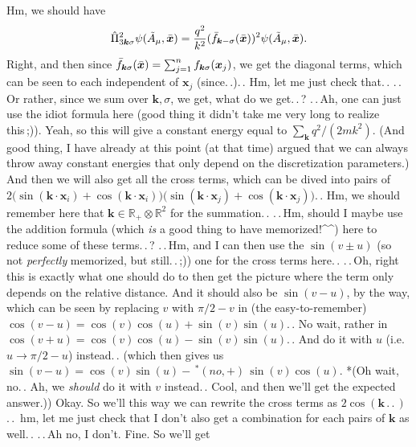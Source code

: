 \documentclass{report}
\begin{document}
Hm, we should have
\begin{align}
\begin{aligned}
	\hat \Pi_{3 \boldsymbol k \sigma}^2
	\psi(\tilde A_\mu, \bar{\boldsymbol{x}\hspace{.05em}}\hspace{-.05em}) = 
		\frac{q^2}{k^2}
		(\bar f_{\boldsymbol{k} -\sigma}(\bar{\boldsymbol{x}\hspace{.05em}}\hspace{-.05em}))^2
		\psi(\tilde A_\mu, \bar{\boldsymbol{x}\hspace{.05em}}\hspace{-.05em}).
\end{aligned}
\end{align}
Right, and then since 
$\bar f_{\boldsymbol{k} \sigma}(\bar{\boldsymbol{x}\hspace{.05em}}\hspace{-.05em}) = 
\sum_{j=1}^n f_{\boldsymbol{k} \sigma}(\boldsymbol{x}_j)$, 
we get the diagonal terms, which can be seen to each independent of $\boldsymbol{x}_j$ (since.\,.).\,. Hm, let me just check that.\,. .\,.\,Or rather, since we sum over $\boldsymbol{k},\sigma$, we get, what do we get.\,.\,? .\,.\,Ah, one can just use the idiot formula here (good thing it didn't take me very long to realize this\,;)). Yeah, so this will give a constant energy equal to $\sum_{\boldsymbol{k}} q^2/(2 m k^2)$. (And good thing, I have already at this point (at that time) argued that we can always throw away constant energies that only depend on the discretization parameters.) And then we will also get all the cross terms, which can be dived into pairs of 
$2
\big(\sin(\boldsymbol{k}\cdot\boldsymbol{x}_i) + 
\cos(\boldsymbol{k}\cdot \boldsymbol{x}_i)\big)
\big(\sin(\boldsymbol{k}\cdot\boldsymbol{x}_j) + 
\cos(\boldsymbol{k}\cdot \boldsymbol{x}_j)\big)$.\,. 
Hm, we should remember here that $\boldsymbol{k}\in \mathbb{R}_+\otimes\mathbb{R}^2$ for the summation.\,. .\,.\,Hm, should I maybe use the addition formula (which \emph{is} a good thing to have memorized!\textasciicircum\textasciicircum) here to reduce some of these terms.\,.\,? .\,.\,Hm, and I can then use the $\sin(v\pm u)$ (so not \emph{perfectly} memorized, but still.\,.\,;)) one for the cross terms here.\,. .\,.\,Oh, right this is exactly what one should do to then get the picture where the term only depends on the relative distance. And it should also be $\sin(v - u)$, by the way, which can be seen by replacing $v$ with $\pi/2 - v$ in (the easy-to-remember) $\cos(v - u) = \cos(v)\cos(u) + \sin(v)\sin(u)$.\,. No wait, rather in $\cos(v + u) = \cos(v)\cos(u) - \sin(v)\sin(u)$.\,. And do it with $u$ (i.e.\ $u\to \pi/2 - u$) instead.\,. (which then gives us $\sin(v - u) = \cos(v)\sin(u) -\,^*(no, +)\, \sin(v)\cos(u)$. *(Oh wait, no.\,. Ah, we \emph{should} do it with $v$ instead.\,. Cool, and then we'll get the expected answer.)) Okay. So we'll this way we can rewrite the cross terms as $2\cos(\boldsymbol{k}\,.\,.\,)$.\,.\, hm, let me just check that I don't also get a combination for each pairs of $\boldsymbol{k}$ as well.\,. .\,.\,Ah no, I don't. Fine. So we'll get 
\end{document}
